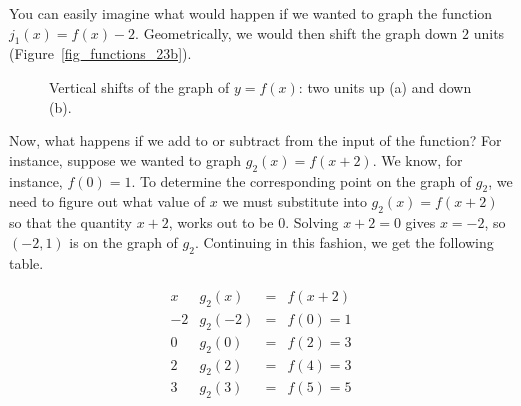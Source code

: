 You can easily imagine what would happen if we wanted to graph the function $j_1(x) = f(x) - 2$.  Geometrically, we would then shift the graph down $2$ units (Figure~\ref{fig_functions_23b}). 

\begin{figure}[H]
\centering
\centerline{
\hspace{0.1cm}
}
\caption{Vertical shifts of the graph of $y=f(x)$: two units up (a) and down (b). }
\end{figure}

Now, what happens if we add to or subtract from the input of the function?  For instance, suppose we wanted to graph $g_2(x) = f(x+2)$.  We know, for instance, $f(0) = 1$.  To determine the corresponding point on the graph of $g_2$, we need to figure out what value of $x$ we must substitute into $g_2(x) = f(x+2)$ so that the quantity $x+2$, works out to be $0$.  Solving $x+2=0$ gives $x=-2$,  so  $(-2,1)$ is on the graph of $g_2$.  Continuing in this fashion, we get the following table.

\[ \begin{array}{r|rcl}  
x & g_2(x)&=&f(x+2)  \\ \hline\hline
-2 & g_2(-2)&=&f(0) = 1   \\  
0  &  g_2(0)&=&f(2) = 3   \\  
2   & g_2(2)&=&f(4) = 3 \\  
3  & g_2(3)&=&f(5) = 5   \\  

\end{array} \] 

